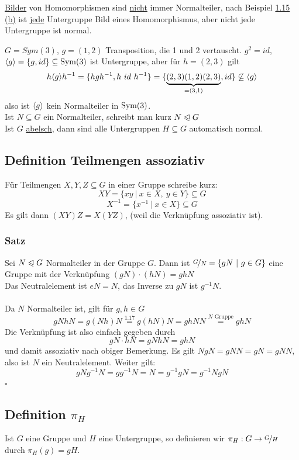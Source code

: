 \uline{Bilder} von Homomorphismen sind \uline{nicht} immer Normalteiler, nach Beispiel \hyperref[sub:homomorphismen]{1.15 (b)} ist \uline{jede} Untergruppe Bild eines Homomorphismus, aber nicht jede Untergruppe ist normal.

$G=Sym(3)$, $g=(1,2)$ Transposition, die 1 und 2 vertauscht. $g^2=id$, $\langle g \rangle=\{g,id\}\subseteq \operatorname{Sym}(3)$ ist Untergruppe, aber für $h=(2,3)$ gilt 
\[
h\langle g \rangle h^{-1}=\{hgh^{-1}, h~id~h^{-1} \} = \{\underbrace{(2,3)(1,2)(2,3)}_{=(3,1)}, id \} \not\subseteq \langle g \rangle
\]
also ist $\langle g \rangle$ kein Normalteiler in $\operatorname{Sym}(3)$.\\

 Ist $N\subseteq G$ ein Normalteiler, schreibt man kurz $N\trianglelefteqslant G$\\

 Ist $G$ \uline{abelsch}, dann sind alle Untergruppen $H\subseteq G$ automatisch normal.

\subsection{Definition Teilmengen assoziativ}
\label{sub:teilmengen}
Für Teilmengen $X,Y,Z \subseteq G$ in einer Gruppe schreibe kurz:\\
\[XY=\{xy~|~x\in X,~y\in Y\}\subseteq G \]
\[X^{-1}=\{x^{-1}~|~x\in X \}\subseteq G \]
Es gilt dann $(XY)Z=X(YZ)$, (weil die Verknüpfung assoziativ ist).
\subsubsection*{Satz}
Sei $N\trianglelefteqslant G$ Normalteiler in der Gruppe $G$. Dann ist $\nicefrac{G}{N}=\{gN~|~g\in G \}$ eine Gruppe mit der Verknüpfung $(gN)\cdot (hN)=ghN$\\
Das Neutralelement ist $eN=N$, das Inverse zu $gN$ ist $g^{-1}N$.\\
\\
Da $N$ Normalteiler ist, gilt für $g,h \in G$
\[gNhN=g(Nh)N\stackrel{\hyperref[sub:normalteiler]{1.17}}{=}g(hN)N=ghNN\stackrel{N\text{ Gruppe}}{=}ghN \]
Die Verknüpfung ist also einfach gegeben durch
\[gN\cdot hN=gNhN=ghN \]
und damit assoziativ nach obiger Bemerkung. Es gilt $NgN=gNN=gN=gNN$, also ist $N$ ein Neutralelement. Weiter gilt:
\[gNg^{-1}N=gg^{-1}N=N=g^{-1}gN=g^{-1}NgN \]
\hfill $\square$

\subsection{Definition $\pi_H$}
\label{def_pi_H}
Ist $G$ eine Gruppe und $H$ eine Untergruppe, so definieren wir $\pi_H: G \to \nicefrac{G}{H}$ durch $\pi_H(g)=gH$.


